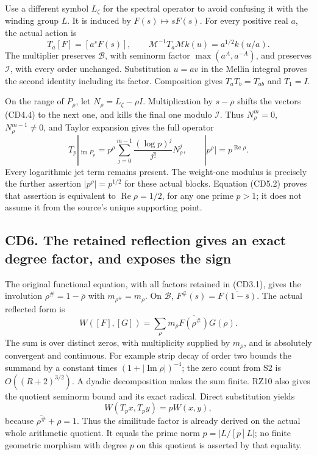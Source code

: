 \documentclass[
]{article}
\begin{document}
Use a different symbol \(L_\zeta\) for the spectral operator to avoid
confusing it with the winding group \(L\). It is induced by
\(F(s)\mapsto sF(s)\). For every positive real \(a\), the actual action
is \[
T_a[F]=[a^sF(s)],\qquad
\mathcal M^{-1}T_a\mathcal Mk(u)=a^{1/2}k(u/a).
\tag{CD5.1}
\] The multiplier preserves \(\mathcal B\), with seminorm factor
\(\max(a^A,a^{-A})\), and preserves \(\mathcal I\), with every order
unchanged. Substitution \(u=av\) in the Mellin integral proves the
second identity including its factor. Composition gives
\(T_aT_b=T_{ab}\) and \(T_1=I\).

On the range of \(P_\rho\), let \(N_\rho=L_\zeta-\rho I\).
Multiplication by \(s-\rho\) shifts the vectors (CD4.4) to the next one,
and kills the final one modulo \(\mathcal I\). Thus \(N_\rho^m=0\),
\(N_\rho^{m-1}\ne0\), and Taylor expansion gives the full operator \[
T_p|_{\operatorname{im}P_\rho}
=p^\rho\sum_{j=0}^{m-1}\frac{(\log p)^j}{j!}N_\rho^j,
\qquad |p^\rho|=p^{\operatorname{Re}\rho}.
\tag{CD5.2}
\] Every logarithmic jet term remains present. The weight-one modulus is
precisely the further assertion \(|p^\rho|=p^{1/2}\) for these actual
blocks. Equation (CD5.2) proves that assertion is equivalent to
\(\operatorname{Re}\rho=1/2\), for any one prime \(p>1\); it does not
assume it from the source's unique supporting point.

\subsection{CD6. The retained reflection gives an exact degree factor,
and exposes the
sign}\label{cd6.-the-retained-reflection-gives-an-exact-degree-factor-and-exposes-the-sign}

The original functional equation, with all factors retained in (CD3.1),
gives the involution \(\rho^\#=1-\overline\rho\) with
\(m_{\rho^\#}=m_\rho\). On \(\mathcal B\),
\(F^\#(s)=\overline{F(1-\overline s)}\). The actual reflected form is \[
W([F],[G])=\sum_{\rho}m_\rho\overline{F(\rho^\#)}G(\rho).
\tag{CD6.1}
\] The sum is over distinct zeros, with multiplicity supplied by
\(m_\rho\), and is absolutely convergent and continuous. For example
strip decay of order two bounds the summand by a constant times
\((1+|\operatorname{Im}\rho|)^{-4}\); the zero count from S2 is
\(O((R+2)^{3/2})\). A dyadic decomposition makes the sum finite. RZ10
also gives the quotient seminorm bound and its exact radical. Direct
substitution yields \[
W(T_p x,T_p y)=pW(x,y),
\tag{CD6.2}
\] because \(\overline{\rho^\#}+\rho=1\). Thus the similitude factor is
already derived on the actual whole arithmetic quotient. It equals the
prime norm \(p=|L/[p]L|\); no finite geometric morphism with degree
\(p\) on this quotient is asserted by that equality.
\end{document}
